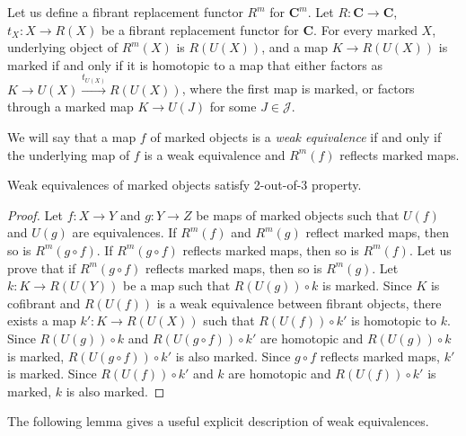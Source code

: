 \documentclass[reqno]{amsart}
\theoremstyle{definition}
\theoremstyle{remark}
\newcommand{\cat}[1]{\mathbf{#1}}
\newcommand{\C}{\cat{C}}
\numberwithin{figure}{section}
\begin{document}
Let us define a fibrant replacement functor $R^m$ for $\C^m$.
Let $R : \C \to \C$, $t_X : X \to R(X)$ be a fibrant replacement functor for $\C$.
For every marked $X$, underlying object of $R^m(X)$ is $R(U(X))$, and a map $K \to R(U(X))$ is marked if and only if it is homotopic to a map that
either factors as $K \to U(X) \xrightarrow{t_{U(X)}} R(U(X))$, where the first map is marked,
or factors through a marked map $K \to U(J)$ for some $J \in \mathcal{J}$.

We will say that a map $f$ of marked objects is a \emph{weak equivalence}
if and only if the underlying map of $f$ is a weak equivalence and $R^m(f)$ reflects marked maps.

\begin{prop}[2-out-of-3]
Weak equivalences of marked objects satisfy 2-out-of-3 property.
\end{prop}
\begin{proof}
Let $f : X \to Y$ and $g : Y \to Z$ be maps of marked objects such that $U(f)$ and $U(g)$ are equivalences.
If $R^m(f)$ and $R^m(g)$ reflect marked maps, then so is $R^m(g \circ f)$.
If $R^m(g \circ f)$ reflects marked maps, then so is $R^m(f)$.
Let us prove that if $R^m(g \circ f)$ reflects marked maps, then so is $R^m(g)$.
Let $k : K \to R(U(Y))$ be a map such that $R(U(g)) \circ k$ is marked.
Since $K$ is cofibrant and $R(U(f))$ is a weak equivalence between fibrant objects,
there exists a map $k' : K \to R(U(X))$ such that $R(U(f)) \circ k'$ is homotopic to $k$.
Since $R(U(g)) \circ k$ and $R(U(g \circ f)) \circ k'$ are homotopic and $R(U(g)) \circ k$ is marked, $R(U(g \circ f)) \circ k'$ is also marked.
Since $g \circ f$ reflects marked maps, $k'$ is marked.
Since $R(U(f)) \circ k'$ and $k$ are homotopic and $R(U(f)) \circ k'$ is marked, $k$ is also marked.
\end{proof}

The following lemma gives a useful explicit description of weak equivalences.
\end{document}
